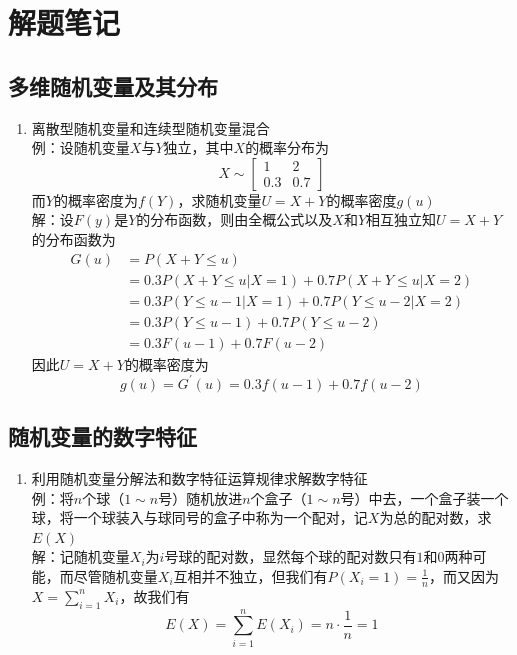\documentclass[12pt,a4paper,UTF8]{book}
\begin{document}
\chapter{解题笔记}

\section{多维随机变量及其分布}
\begin{enumerate}
\item 离散型随机变量和连续型随机变量混合\\
例：设随机变量$X$与$Y$独立，其中$X$的概率分布为
\[X\sim\begin{bmatrix}1&2\\0.3&0.7\end{bmatrix}\]
而$Y$的概率密度为$f\left(Y\right)$，求随机变量$U=X+Y$的概率密度$g\left(u\right)$\\
解：设$F\left(y\right)$是$Y$的分布函数，则由全概公式以及$X$和$Y$相互独立知$U=X+Y$的分布函数为
\[\begin{aligned}
G\left(u\right)&=P\left(X+Y\leq u\right)\\
&=0.3P\left(X+Y\leq u|X=1\right)+0.7P\left(X+Y\leq u|X=2\right)\\
&=0.3P\left(Y\leq u-1|X=1\right)+0.7P\left(Y\leq u-2|X=2\right)\\
&=0.3P\left(Y\leq u-1\right)+0.7P\left(Y\leq u-2\right)\\
&=0.3F\left(u-1\right)+0.7F\left(u-2\right)
\end{aligned}\]
因此$U=X+Y$的概率密度为
\[g\left(u\right)=G^{\prime}\left(u\right)=0.3f\left(u-1\right)+0.7f\left(u-2\right)\]
\end{enumerate}


\section{随机变量的数字特征}
\begin{enumerate}
\item 利用随机变量分解法和数字特征运算规律求解数字特征\\
例：将$n$个球（$1\sim n$号）随机放进$n$个盒子（$1\sim n$号）中去，一个盒子装一个球，将一个球装入与球同号的盒子中称为一个配对，记$X$为总的配对数，求$E\left(X\right)$\\
解：记随机变量$X_i$为$i$号球的配对数，显然每个球的配对数只有$1$和$0$两种可能，而尽管随机变量$X_i$互相并不独立，但我们有$P\left(X_i=1\right)=\frac{1}{n}$，而又因为$X=\sum\limits_{i=1}^{n}X_i$，故我们有
\[E\left(X\right)=\sum\limits_{i=1}^{n}E\left(X_i\right)=n\cdot\frac{1}{n}=1\]
\end{enumerate}
\end{document}
